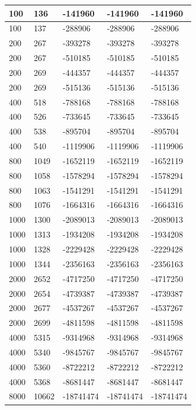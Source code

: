 \begin{longtable}[H]{|p{1.5cm}|p{1.5cm}|p{1.5cm}|p{3cm}|p{3.5cm}|}
    100 & 136 & -141960 & -141960 & -141960 \\ \hline
    100 & 137 & -288906 & -288906 & -288906 \\ \hline
    200 & 267 & -393278 & -393278 & -393278 \\ \hline
    200 & 267 & -510185 & -510185 & -510185 \\ \hline
    200 & 269 & -444357 & -444357 & -444357 \\ \hline
    200 & 269 & -515136 & -515136 & -515136 \\ \hline
    400 & 518 & -788168 & -788168 & -788168 \\ \hline
    400 & 526 & -733645 & -733645 & -733645 \\ \hline
    400 & 538 & -895704 & -895704 & -895704 \\ \hline
    400 & 540 & -1119906 & -1119906 & -1119906 \\ \hline
    800 & 1049 & -1652119 & -1652119 & -1652119 \\ \hline 
    800 & 1058 & -1578294 & -1578294 & -1578294 \\ \hline 
    800 & 1063 & -1541291 & -1541291 & -1541291 \\ \hline
    800 & 1076 & -1664316 & -1664316 & -1664316 \\ \hline
    1000 & 1300 & -2089013 & -2089013 & -2089013 \\ \hline
    1000 & 1313 & -1934208 & -1934208 & -1934208 \\ \hline
    1000 & 1328 & -2229428 & -2229428 & -2229428 \\ \hline
    1000 & 1344 & -2356163 & -2356163 & -2356163 \\ \hline
    2000 & 2652 & -4717250 & -4717250 & -4717250 \\ \hline
    2000 & 2654 & -4739387 & -4739387 & -4739387 \\ \hline 
    2000 & 2677 & -4537267 & -4537267 & -4537267 \\ \hline 
    2000 & 2699 & -4811598 & -4811598 & -4811598 \\ \hline 
    4000 & 5315 & -9314968 & -9314968 & -9314968 \\ \hline
    4000 & 5340 & -9845767 & -9845767 & -9845767 \\ \hline
    4000 & 5360 & -8722212 & -8722212 & -8722212 \\ \hline
    4000 & 5368 & -8681447 & -8681447 & -8681447 \\ \hline 
    8000 & 10662 & -18741474 & -18741474 & -18741474 \\ \hline  

\end{longtable}
